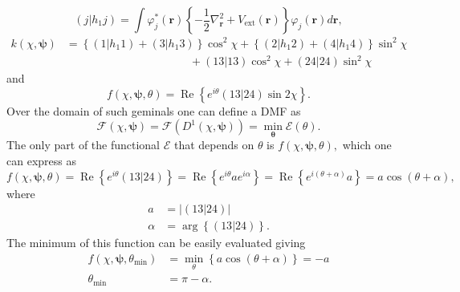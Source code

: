 \documentclass[aps,preprint]{revtex4}%
\begin{document}
\begin{equation}
\left(  j\left\vert h_{1}j\right.  \right)  =\int\varphi_{j}^{\ast}\left(
\boldsymbol{r}\right)  \left\{  -\frac{1}{2}\nabla_{\boldsymbol{r}}%
^{2}+V_{\text{ext}}\left(  \boldsymbol{r}\right)  \right\}  \varphi_{j}\left(
\boldsymbol{r}\right)  d\boldsymbol{r},
\end{equation}%
\begin{align}
k\left(  \chi,\boldsymbol{\psi}\right)   &  =\left\{  \left(  1\left\vert
h_{1}1\right.  \right)  +\left(  3\left\vert h_{1}3\right.  \right)  \right\}
\cos^{2}\chi+\left\{  \left(  2\left\vert h_{1}2\right.  \right)  +\left(
4\left\vert h_{1}4\right.  \right)  \right\}  \sin^{2}\chi\nonumber\\
&  \qquad\qquad\qquad\qquad\qquad\quad+\left(  \left.  13\right\vert
13\right)  \cos^{2}\chi+\left(  \left.  24\right\vert 24\right)  \sin^{2}\chi
\end{align}
and
\begin{equation}
f\left(  \chi,\boldsymbol{\psi},\theta\right)  =\operatorname{Re}\left\{
e^{i\theta}\left(  \left.  13\right\vert 24\right)  \sin2\chi\right\}  .
\end{equation}
Over the domain of such geminals one can define a DMF as
\begin{equation}
\mathcal{F}\left(  \chi,\boldsymbol{\psi}\right)  =\mathcal{F}\left(
D^{1}\left(  \chi,\boldsymbol{\psi}\right)  \right)  =\min_{\boldsymbol{\theta
}}\mathcal{E}\left(  \theta\right)  .
\end{equation}
The only part of the functional $\mathcal{E}$ that depends on $\theta$ is
$f\left(  \chi,\boldsymbol{\psi},\theta\right)  ,$ which one can express as
\begin{equation}
f\left(  \chi,\boldsymbol{\psi},\theta\right)  =\operatorname{Re}\left\{
e^{i\theta}\left(  \left.  13\right\vert 24\right)  \right\}
=\operatorname{Re}\left\{  e^{i\theta}ae^{i\alpha}\right\}  =\operatorname{Re}%
\left\{  e^{i\left(  \theta+\alpha\right)  }a\right\}  =a\cos\left(
\theta+\alpha\right)  ,
\end{equation}
where
\begin{align}
a &  =\left\vert \left(  \left.  13\right\vert 24\right)  \right\vert \\
\alpha &  =\arg\left\{  \left(  \left.  13\right\vert 24\right)  \right\}  .
\end{align}
The minimum of this function can be easily evaluated giving
\begin{align}
f\left(  \chi,\boldsymbol{\psi},\theta_{\min}\right)   &  =\min_{\theta
}\left\{  a\cos\left(  \theta+\alpha\right)  \right\}  =-a\\
\theta_{\min} &  =\pi-\alpha.
\end{align}
\end{document}
